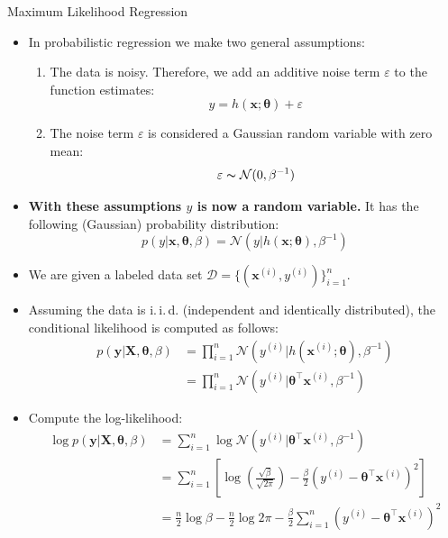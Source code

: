 \begin{dwHeaderFrame}{Maximum Likelihood Regression}
	\begin{itemize}
		\item In probabilistic regression we make two general assumptions:
		\begin{enumerate}
			\item The data is noisy. Therefore, we add an additive noise term $\varepsilon$ to the function estimates:
			\begin{equation}
				y = h(\bm{x}; \bm{\theta}) + \varepsilon
			\end{equation}
			\item The noise term $\varepsilon$ is considered a Gaussian random variable with zero mean:
			\begin{equation}
				\varepsilon \thicksim \mathcal{N}(0, \beta^{-1})
			\end{equation}
		\end{enumerate}
		\item \textbf{With these assumptions $y$ is now a random variable.} It has the following (Gaussian) probability distribution:
		\begin{equation}
			p(y \vert \bm{x}, \bm{\theta}, \beta) = \mathcal{N}(y \vert h(\bm{x}; \bm{\theta}), \beta^{-1})
		\end{equation}
	\end{itemize}
\end{dwHeaderFrame}


\begin{frame}
	\begin{itemize}
		\item We are given a labeled data set $\mathcal{D} = \{ (\bm{x}^{(i)}, y^{(i)}) \}_{i=1}^n$.
		\item Assuming the data is i.\,i.\,d. (independent and identically distributed), the conditional likelihood is computed as follows:
		\begin{align}
			p(\bm{y} \vert \bm{X}, \bm{\theta}, \beta)
				&= \prod_{i=1}^n \mathcal{N}(y^{(i)} \vert h(\bm{x}^{(i)}; \bm{\theta}), \beta^{-1}) \\
				&= \prod_{i=1}^n \mathcal{N}(y^{(i)} \vert \bm{\theta}^{\intercal} \bm{x}^{(i)}, \beta^{-1})
		\end{align}
		\item Compute the log-likelihood:
		\begin{align}
			\log p(\bm{y} \vert \bm{X}, \bm{\theta}, \beta)
				&= \sum_{i=1}^n \log \mathcal{N}(y^{(i)} \vert \bm{\theta}^{\intercal} \bm{x}^{(i)}, \beta^{-1}) \\
				&= \sum_{i=1}^n \left[ \log \left( \frac{\sqrt{\beta}}{\sqrt{2 \pi}} \right) - \frac{\beta}{2} (y^{(i)} - \bm{\theta}^{\intercal} \bm{x}^{(i)})^2 \right] \\
				&= \frac{n}{2} \log \beta - \frac{n}{2} \log 2 \pi - \frac{\beta}{2} \sum_{i=1}^n (y^{(i)} - \bm{\theta}^{\intercal} \bm{x}^{(i)})^2
		\end{align}
	\end{itemize}
\end{frame}


